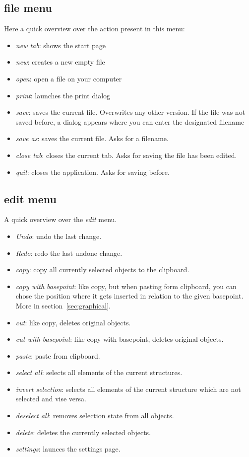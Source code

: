 \documentclass[a4paper,11pt]{report}
\begin{document}
\subsection{file menu}
Here a quick overview over the action present in this menu:
\begin{itemize}
	\item \textit{new tab}: shows the start page
	\item \textit{new}: creates a new empty file
	\item \textit{open}: open a file on your computer
	\item \textit{print}: launches the print dialog
	\item \textit{save}: saves the current file. Overwrites any other version. If the file was not saved before, a dialog appears where you can enter the designated filename
	\item \textit{save as}: saves the current file. Asks for a filename.
	\item \textit{close tab}: closes the current tab. Asks for saving the file has been edited.
	\item \textit{quit}: closes the application. Asks for saving before.
\end{itemize}

\subsection{edit menu}
A quick overview over the \textit{edit} menu. 
\begin{itemize}
	\item \textit{Undo}: undo the last change.
	\item \textit{Redo}: redo the last undone change.
	\item \textit{copy}: copy all currently selected objects to the clipboard. 
	\item \textit{copy with basepoint}: like copy, but when pasting form clipboard, you can chose the position where it gets inserted in relation to the given basepoint. More in section~\ref{sec:graphical}.
	\item \textit{cut}: like copy, deletes original objects.
	\item \textit{cut with basepoint}: like copy with basepoint, deletes original objects.
	\item \textit{paste}: paste from clipboard.
	\item \textit{select all}: selects all elements of the current structures.
	\item \textit{invert selection}: selects all elements of the current structure which are not selected and vise versa.
	\item \textit{deselect all}: removes selection state from all objects.
	\item \textit{delete}: deletes the currently selected objects.
	\item \textit{settings}: launces the settings page.
\end{itemize}
\end{document}
